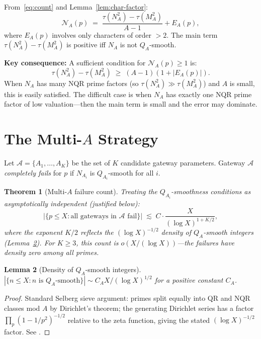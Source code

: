 \documentclass[12pt]{amsart}
\newtheorem{theorem}{Theorem}[section]
\newtheorem{lemma}[theorem]{Lemma}
\theoremstyle{definition}
\theoremstyle{remark}
\begin{document}
From~\eqref{eq:count} and Lemma~\ref{lem:char-factor}:
\begin{equation}\label{eq:main-error}
  \mathcal{N}_A(p) \;=\; \frac{\tau(N_A^2) - \tau(M_A^2)}{A-1} + E_A(p),
\end{equation}
where $E_A(p)$ involves only characters of order $> 2$.
The main term $\tau(N_A^2) - \tau(M_A^2)$ is positive iff $N_A$ is not $Q_A$-smooth.

\textbf{Key consequence:}
A sufficient condition for $\mathcal{N}_A(p) \ge 1$ is:
\[
  \tau(N_A^2) - \tau(M_A^2) \;\ge\; (A-1)(1 + |E_A(p)|).
\]
When $N_A$ has many NQR prime factors (so $\tau(N_A^2) \gg \tau(M_A^2)$)
and $A$ is small, this is easily satisfied.
The difficult case is when $N_A$ has exactly one NQR prime factor of low
valuation---then the main term is small and the error may dominate.

\section{The Multi-$A$ Strategy}\label{sec:multiA}

Let $\mathcal{A} = \{A_1, \ldots, A_K\}$ be the set of $K$ candidate
gateway parameters.  Gateway $\mathcal{A}$ \emph{completely fails} for $p$
if $N_{A_i}$ is $Q_{A_i}$-smooth for all $i$.

\begin{theorem}[Multi-$A$ failure count]\label{thm:multiA}
Treating the $Q_{A_i}$-smoothness conditions as asymptotically independent
(justified below):
\[
  |\{p \le X : \text{all gateways in } \mathcal{A} \text{ fail}\}|
  \;\lesssim\; C \cdot \frac{X}{(\log X)^{1 + K/2}},
\]
where the exponent $K/2$ reflects the $(\log X)^{-1/2}$ density
of $Q_A$-smooth integers (Lemma~\ref{lem:qa-density}).
For $K \ge 3$, this count is $o(X/(\log X))$---the failures
have density zero among all primes.
\end{theorem}

\begin{lemma}[Density of $Q_A$-smooth integers]\label{lem:qa-density}
$|\{n \le X : n \text{ is } Q_A\text{-smooth}\}| \sim C_A X / (\log X)^{1/2}$
for a positive constant $C_A$.
\end{lemma}

\begin{proof}
Standard Selberg sieve argument: primes split equally into QR and NQR classes
mod $A$ by Dirichlet's theorem; the generating Dirichlet series has a factor
$\prod_p (1 - 1/p^2)^{-1/2}$ relative to the zeta function, giving the
stated $(\log X)^{-1/2}$ factor.
See \cite{Tenenbaum1984, Halberstam1974}.
\end{proof}
\end{document}
